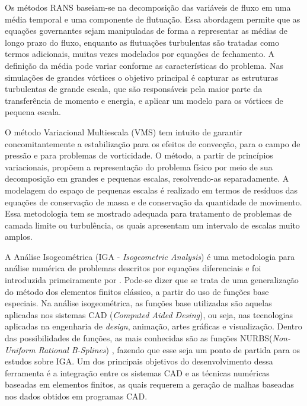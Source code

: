 \documentclass[tese_patricia.tex]{subfiles}
\begin{document}
Os métodos RANS baseiam-se na decomposição das variáveis de fluxo em uma média temporal e uma componente de flutuação. Essa abordagem permite que as equações governantes sejam manipuladas de forma a representar as médias de longo prazo do fluxo, enquanto as flutuações turbulentas são tratadas como termos adicionais, muitas vezes modelados por equações de fechamento. A definição da média pode variar conforme as características do problema. Nas simulações de grandes vórtices o objetivo principal é capturar as estruturas turbulentas de grande escala, que são responsáveis pela maior parte da transferência de momento e energia, e aplicar um modelo para os vórtices de pequena escala. 

O método Variacional Multiescala (VMS) \cite{Hughes:1995,Hughesetal:1998,Hughesetal:2001,BazilevsTT:2013} tem intuito de garantir concomitantemente a estabilização para os efeitos de convecção, para o campo de pressão e para problemas de vorticidade. O método, a partir de princípios variacionais, propõem a representação do problema físico por meio de sua decomposição em grandes e pequenas escalas, resolvendo-as separadamente.  A modelagem do espaço de pequenas escalas é realizado em termos de resíduos das equações de conservação de massa e de conservação da quantidade de movimento. Essa metodologia tem se mostrado adequada para tratamento de problemas de camada limite ou turbulência, os quais apresentam um intervalo de escalas muito amplos.

A Análise Isogeométrica (IGA - \textit{Isogeometric Analysis}) é uma metodologia para análise numérica de problemas descritos por equações diferenciais e foi introduzida primeiramente por . Pode-se dizer que se trata de uma generalização do método dos elementos finitos clássico, a partir do uso de funções base especiais. Na análise isogeométrica, as funções base utilizadas são aquelas aplicadas nos sistemas CAD (\textit{Computed Aided Desing}), ou seja, nas tecnologias aplicadas na engenharia de \textit{design}, animação, artes gráficas e visualização.  Dentro das possibilidades de funções, as mais conhecidas são as funções NURBS(\textit{Non-Uniform Rational B-Splines}) \cite{PiegT:1996}, fazendo que esse seja um ponto de partida para os estudos sobre IGA. Um dos principais objetivos do desenvolvimento dessa ferramenta é a integração entre os sistemas CAD e as técnicas numéricas baseadas em elementos finitos, as quais requerem a geração de malhas baseadas nos dados obtidos em programas CAD. 
\end{document}
